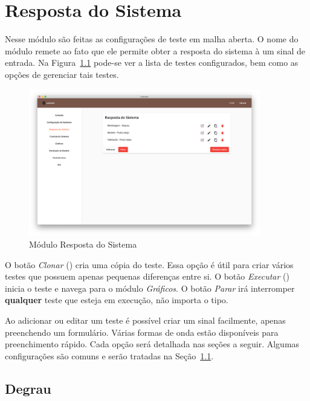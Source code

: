 
\chapter{Resposta do Sistema}%
\label{chapter:system-response}

Nesse módulo são feitas as configurações de teste em malha aberta. O nome do
módulo remete ao fato que ele permite obter a resposta do sistema à um sinal de
entrada. Na Figura~\ref{fig:system-response1} pode-se ver a lista de testes
configurados, bem como as opções de gerenciar tais testes.

\begin{figure}[ht!]
    \centering
    \includegraphics[width=0.9\textwidth]{imgs/system-response1}
    \caption[Módulo Resposta do Sistema]{Módulo Resposta do Sistema}%
    \label{fig:system-response1}
\end{figure}

O botão \textit{Clonar} () cria uma cópia do teste. Essa
opção é útil para criar vários testes que possuem apenas pequenas diferenças
entre si. O botão \textit{Executar} () inicia o teste e navega
para o módulo \textit{Gráficos}. O botão \textit{Parar} irá interromper
\textbf{qualquer} teste que esteja em execução, não importa o tipo.

Ao adicionar ou editar um teste é possível criar um sinal facilmente, apenas
preenchendo um formulário. Várias formas de onda estão disponíveis para
preenchimento rápido. Cada opção será detalhada nas seções a seguir. Algumas
configurações são comuns e serão tratadas na Seção~\ref{sec:step}.

\section{Degrau}%
\label{sec:step}

